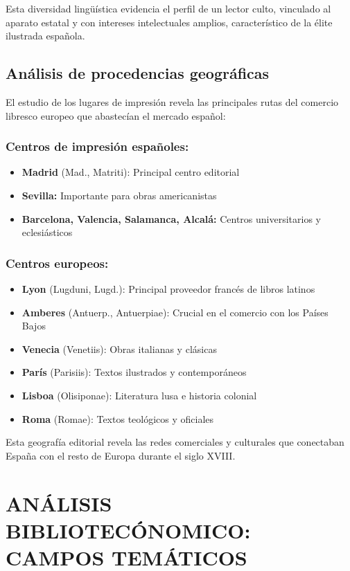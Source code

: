 \documentclass[12pt,a4paper]{article}
\begin{document}
Esta diversidad lingüística evidencia el perfil de un lector culto, vinculado al aparato estatal y con intereses intelectuales amplios, característico de la élite ilustrada española.

\subsection{Análisis de procedencias geográficas}

El estudio de los lugares de impresión revela las principales rutas del comercio libresco europeo que abastecían el mercado español:

\subsubsection*{Centros de impresión españoles:}
\begin{itemize}
    \item \textbf{Madrid} (Mad., Matriti): Principal centro editorial
    \item \textbf{Sevilla:} Importante para obras americanistas
    \item \textbf{Barcelona, Valencia, Salamanca, Alcalá:} Centros universitarios y eclesiásticos
\end{itemize}

\subsubsection*{Centros europeos:}
\begin{itemize}
    \item \textbf{Lyon} (Lugduni, Lugd.): Principal proveedor francés de libros latinos
    \item \textbf{Amberes} (Antuerp., Antuerpiae): Crucial en el comercio con los Países Bajos
    \item \textbf{Venecia} (Venetiis): Obras italianas y clásicas
    \item \textbf{París} (Parisiis): Textos ilustrados y contemporáneos
    \item \textbf{Lisboa} (Olisiponae): Literatura lusa e historia colonial
    \item \textbf{Roma} (Romae): Textos teológicos y oficiales
\end{itemize}

Esta geografía editorial revela las redes comerciales y culturales que conectaban España con el resto de Europa durante el siglo XVIII.

\section{ANÁLISIS BIBLIOTECÓNOMICO: CAMPOS TEMÁTICOS}
\end{document}
